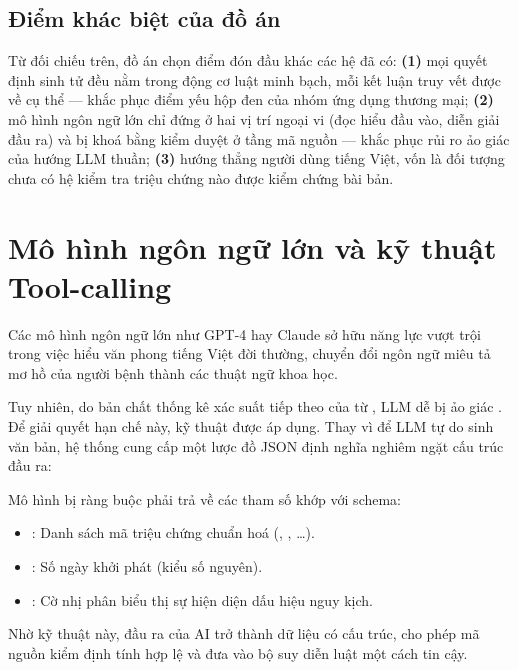 \subsection{Điểm khác biệt của đồ án}

Từ đối chiếu trên, đồ án chọn điểm đón đầu khác các hệ đã có: \textbf{(1)}
mọi quyết định sinh tử đều nằm trong động cơ luật minh bạch, mỗi kết luận
truy vết được về  cụ thể — khắc phục điểm yếu hộp đen của
nhóm ứng dụng thương mại; \textbf{(2)} mô hình ngôn ngữ lớn chỉ đứng ở hai
vị trí ngoại vi (đọc hiểu đầu vào, diễn giải đầu ra) và bị khoá bằng kiểm
duyệt ở tầng mã nguồn — khắc phục rủi ro ảo giác của hướng LLM thuần;
\textbf{(3)} hướng thẳng người dùng tiếng Việt, vốn là đối tượng chưa có hệ
kiểm tra triệu chứng nào được kiểm chứng bài bản.

\section{Mô hình ngôn ngữ lớn và kỹ thuật Tool-calling}

Các mô hình ngôn ngữ lớn  như GPT-4 hay Claude \cite{Singhal2023}
sở hữu năng lực vượt trội trong việc hiểu văn phong tiếng Việt đời thường,
chuyển đổi ngôn ngữ miêu tả mơ hồ của người bệnh thành các thuật ngữ khoa học.

Tuy nhiên, do bản chất thống kê xác suất tiếp theo của từ , LLM dễ bị ảo giác \cite{Thirunavukarasu2023}. Để giải quyết hạn
chế này, kỹ thuật 
\cite{Schick2023} được áp dụng. Thay vì để LLM tự do sinh văn bản, hệ thống
cung cấp một lược đồ JSON  định nghĩa nghiêm ngặt cấu trúc đầu ra:

\begin{vidu}
Mô hình bị ràng buộc phải trả về các tham số khớp với schema:
\begin{itemize}[leftmargin=1.5em, itemsep=1pt]
  \item {}: Danh sách mã triệu chứng chuẩn hoá (,
        , \dots).
  \item {}: Số ngày khởi phát (kiểu số nguyên).
  \item {}: Cờ nhị phân biểu thị sự hiện diện dấu hiệu nguy kịch.
\end{itemize}
\end{vidu}

Nhờ kỹ thuật này, đầu ra của AI trở thành dữ liệu có cấu trúc, cho phép mã nguồn
kiểm định tính hợp lệ  và đưa vào bộ suy diễn luật một cách tin cậy.

